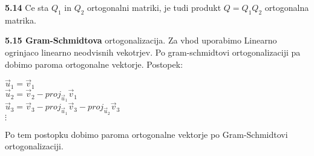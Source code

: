\documentclass{article}
\begin{document}
\begin{multicols}{3}
\textbf{5.14} Ce sta $Q_{1}$ in $Q_{2}$ ortogonalni matriki, je tudi produkt $Q = Q_{1}Q_{2}$ ortogonalna
matrika.

\textbf{5.15 Gram-Schmidtova} ortogonalizacija. Za vhod uporabimo Linearno ogrinjaco linearno neodvisnih vekotrjev. Po 
gram-schmidtovi ortogonalizaciji pa dobimo paroma ortogonalne vektorje.
Postopek:
\begin{center}
    \begin{math}
        \vec{u}_{1} = \vec{v}_{1}
    \end{math}\\
    \begin{math}
        \vec{u}_{2} = \vec{v}_{2} - proj_{\vec{u}_{1}}\vec{v}_{1}
    \end{math}\\
    \begin{math}
        \vec{u}_{3} = \vec{v}_{3} - proj_{\vec{u}_{1}}\vec{v}_{3} - proj_{\vec{u}_{2}}\vec{v}_{3}
    \end{math}\\
    \begin{math}
        \vdots
    \end{math}
\end{center}
Po tem postopku dobimo paroma ortogonalne vektorje po Gram-Schmidtovi ortogonalizaciji.



\end{multicols}
\end{document}
